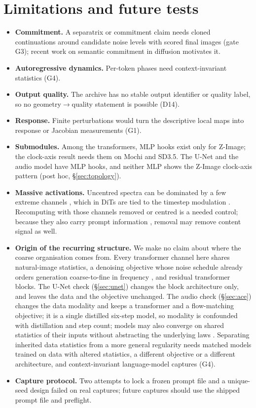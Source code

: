 \documentclass[11pt]{article}
\begin{document}
\section{Limitations and future tests}\label{sec:limits}
\begin{itemize}
 \item \textbf{Commitment.} A separatrix or commitment claim needs cloned continuations around candidate noise levels with scored final images (gate G3); recent work on semantic commitment in diffusion \citep{handke2026entropic,raya2023spontaneous} motivates it.
 \item \textbf{Autoregressive dynamics.} Per-token phases need context-invariant statistics (G4).
 \item \textbf{Output quality.} The archive has no stable output identifier or quality label, so no geometry$\to$quality statement is possible (D14).
 \item \textbf{Response.} Finite perturbations would turn the descriptive local maps into response or Jacobian measurements (G1).
 \item \textbf{Submodules.} Among the transformers, MLP hooks exist only for Z-Image; the clock-axis result needs them on Mochi and SD3.5. The U-Net and the audio model have MLP hooks, and neither MLP shows the Z-Image clock-axis pattern (post hoc, \S\ref{sec:topology}).
 \item \textbf{Massive activations.} Uncentred spectra can be dominated by a few extreme channels \citep{sun2024massive,sun2026anatomy}, which in DiTs are tied to the timestep modulation \citep{gan2025massive,gan2025unleashing}. Recomputing with those channels removed or centred is a needed control; because they also carry prompt information \citep{turri2026few}, removal may remove content signal as well.
 \item \textbf{Origin of the recurring structure.} We make no claim about where the coarse organisation comes from. Every transformer channel here shares natural-image statistics, a denoising objective whose noise schedule already orders generation coarse-to-fine in frequency \citep{falck2025fourier}, and residual transformer blocks. The U-Net check (\S\ref{sec:unet}) changes the block architecture only, and leaves the data and the objective unchanged. The audio check (\S\ref{sec:ace}) changes the data modality and keeps a transformer and a flow-matching objective; it is a single distilled six-step model, so modality is confounded with distillation and step count; models may also converge on shared statistics of their inputs \citep{huh2024platonic} without abstracting the underlying laws \citep{kang2025videophysics}. Separating inherited data statistics from a more general regularity needs matched models trained on data with altered statistics, a different objective or a different architecture, and context-invariant language-model captures (G4).
 \item \textbf{Capture protocol.} Two attempts to lock a frozen prompt file and a unique-seed design failed on real captures; future captures should use the shipped prompt file and preflight.
\end{itemize}
\end{document}
